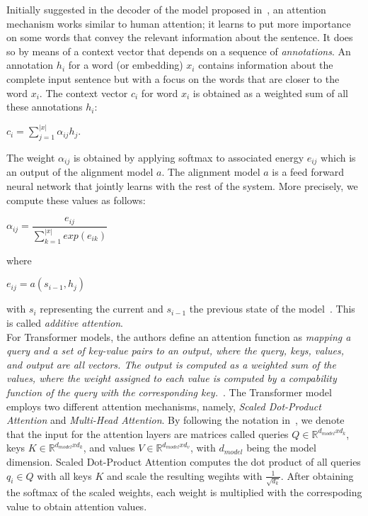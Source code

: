Initially suggested in the decoder of the model proposed in~\parencite{NeuralMachineTranslationByJointlyLearning_Bahdanau}, an attention mechanism works similar to human attention; it learns to put more importance on some words that convey the relevant information about the sentence. It does so by means of a context vector that depends on a sequence of \emph{annotations}. An annotation $h_i$ for a word (or embedding) $x_i$ contains information about the complete input sentence but with a focus on the words that are closer to the word $x_i$. The context vector $c_i$ for word $x_i$ is obtained as a weighted sum of all these annotations $h_i$:
\begin{center}
    $c_i = \sum_{j=1}^{|x|} \alpha_{ij} h_j$.
\end{center}
The weight $\alpha_{ij}$ is obtained by applying softmax to associated energy $e_{ij}$ which is an output of the alignment model $a$. The alignment model $a$ is a feed forward neural network that jointly learns with the rest of the system. More precisely, we compute these values as follows:
\begin{center}
    $\alpha_{ij} = \dfrac{e_{ij}}{\sum_{k=1}^{|x|} exp(e_{ik})}$
\end{center}
where
\begin{center}
    $e_{ij} = a(s_{i-1}, h_j)$
\end{center}
with $s_i$ representing the current and $s_{i-1}$ the previous state of the
model~\parencite{NeuralMachineTranslationByJointlyLearning_Bahdanau}. This is called \emph{additive attention}.\\
For Transformer models, the authors define an attention function as \emph{mapping a query and a set of key-value pairs to an output, where the query, keys, values, and output are all vectors. The output is computed as a weighted sum of the values, where the weight assigned to each value is computed by a compability function of the query with the corresponding key.}~\parencite{AttentionIsAllYouNeed_Vaswani}. The Transformer model employs two different attention mechanisms, namely, \emph{Scaled Dot-Product Attention} and \emph{Multi-Head Attention}. By following the notation in~\parencite{AttentionIsAllYouNeed_Vaswani}, we denote that the input for the attention layers are matrices called queries $Q \in \mathbb{R}^{d_{model}xd_k}$, keys $K \in \mathbb{R}^{d_{model}xd_k}$, and values $V \in \mathbb{R}^{d_{model}xd_v}$, with $d_{model}$ being the model dimension. Scaled Dot-Product Attention computes the dot product of all queries $q_i \in Q$ with all keys $K$ and scale the resulting wegihts with $\frac{1}{\sqrt{d_k}}$. After obtaining the softmax of the scaled weights, each weight is multiplied with the correspoding value to obtain attention values.
